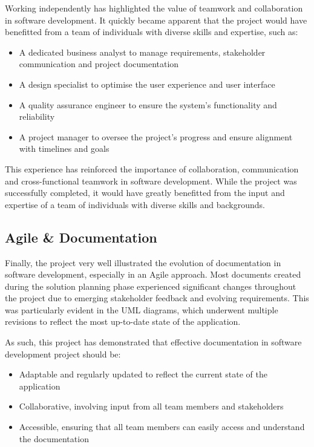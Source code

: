 Working independently has highlighted the value of teamwork and collaboration in software development. It quickly became apparent that the project would have benefitted from a team of individuals with diverse skills and expertise, such as:

\begin{itemize}
    \item A dedicated business analyst to manage requirements, stakeholder communication and project documentation
    \item A design specialist to optimise the user experience and user interface
    \item A quality assurance engineer to ensure the system's functionality and reliability
    \item A project manager to oversee the project's progress and ensure alignment with timelines and goals
\end{itemize}

This experience has reinforced the importance of collaboration, communication and cross-functional teamwork in software development. While the project was successfully completed, it would have greatly benefitted from the input and expertise of a team of individuals with diverse skills and backgrounds.

\subsection{Agile \& Documentation}

Finally, the project very well illustrated the evolution of documentation in software development, especially in an Agile approach. Most documents created during the solution planning phase experienced significant changes throughout the project due to emerging stakeholder feedback and evolving requirements. This was particularly evident in the UML diagrams, which underwent multiple revisions to reflect the most up-to-date state of the application.

As such, this project has demonstrated that effective documentation in software development project should be:

\begin{itemize}
    \item Adaptable and regularly updated to reflect the current state of the application
    \item Collaborative, involving input from all team members and stakeholders
    \item Accessible, ensuring that all team members can easily access and understand the documentation
\end{itemize}

